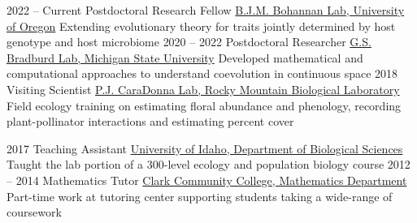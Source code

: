 \documentclass[9pt]{developercv} %
\begin{document}
\vspace{-0 pt}
\begin{entrylist}
	\entry
        {2022 -- Current}
		{Postdoctoral Research Fellow}
		{\href{https://pages.uoregon.edu/bohannanlab/}{B.J.M. Bohannan Lab, University of Oregon}}
		{Extending evolutionary theory for traits jointly determined by host genotype and host microbiome}
        \entry
        {2020 -- 2022}
		{Postdoctoral Researcher}
		{\href{http://www.genescape.org/people.html}{G.S. Bradburd Lab, Michigan State University}}
		{Developed mathematical and computational approaches to understand coevolution in continuous space}
        \entry
        {2018}
		{Visiting Scientist}
		{\href{http://paulcaradonna.weebly.com/}{P.J. CaraDonna Lab, Rocky Mountain Biological Laboratory}}
		{Field ecology training on estimating floral abundance and phenology, recording plant-pollinator interactions and estimating percent cover}
\end{entrylist}

\vspace{-5 pt}
\begin{entrylist}
	\entry
        {2017}
		{Teaching Assistant}
		{\href{https://www.uidaho.edu/sci/biology}{University of Idaho, Department of Biological Sciences}}
        {Taught the lab portion of a 300-level ecology and population biology course}
        \entry
        {2012 -- 2014}
		{Mathematics Tutor}
		{\href{https://www.clark.edu/academics/programs/dept/mathematics/}{Clark Community College, Mathematics Department}}
        {Part-time work at tutoring center supporting students taking a wide-range of coursework}
\end{entrylist}
\end{document}
